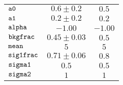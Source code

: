 \begin{tabular}{lcc}
$\verb+a0+ $ & $  0.6\pm 0.2$ & $ 0.5$\\
$\verb+a1+ $ & $  0.2\pm 0.2$ & $ 0.2$\\
$\verb+alpha+ $ & $ -1.00$ & $-1.00$\\
$\verb+bkgfrac+ $ & $  0.45\pm 0.03$ & $ 0.5$\\
$\verb+mean+ $ & $  5$ & $ 5$\\
$\verb+sig1frac+ $ & $  0.71\pm 0.06$ & $ 0.8$\\
$\verb+sigma1+ $ & $  0.5$ & $ 0.5$\\
$\verb+sigma2+ $ & $  1$ & $ 1$\\
\end{tabular}
